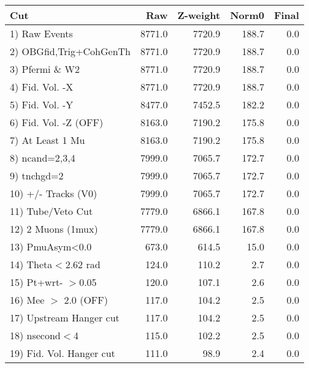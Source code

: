  \begin{table}[h!]\centering
 \begin{tabular}{||l||r|r|r|r||}
 \hline
 \hline
 Cut & Raw & Z-weight & Norm0 & Final \\
 \hline
  1) Raw Events           &      8771.0 &      7720.9 &       188.7 &         0.0 \\
  2) OBGfid,Trig+CohGenTh &      8771.0 &      7720.9 &       188.7 &         0.0 \\
  3) Pfermi \& W2         &      8771.0 &      7720.9 &       188.7 &         0.0 \\
  4) Fid. Vol. -X         &      8771.0 &      7720.9 &       188.7 &         0.0 \\
  5) Fid. Vol. -Y         &      8477.0 &      7452.5 &       182.2 &         0.0 \\
  6) Fid. Vol. -Z (OFF)   &      8163.0 &      7190.2 &       175.8 &         0.0 \\
  7) At Least 1 Mu        &      8163.0 &      7190.2 &       175.8 &         0.0 \\
  8) ncand=2,3,4          &      7999.0 &      7065.7 &       172.7 &         0.0 \\
  9) tnchgd=2             &      7999.0 &      7065.7 &       172.7 &         0.0 \\
 10) +/- Tracks (V0)      &      7999.0 &      7065.7 &       172.7 &         0.0 \\
 11) Tube/Veto Cut        &      7779.0 &      6866.1 &       167.8 &         0.0 \\
 12) 2 Muons (1mux)       &      7779.0 &      6866.1 &       167.8 &         0.0 \\
 13) PmuAsym<0.0          &       673.0 &       614.5 &        15.0 &         0.0 \\
 14) Theta$<$2.62 rad     &       124.0 &       110.2 &         2.7 &         0.0 \\
 15) Pt+wrt- $>$0.05      &       120.0 &       107.1 &         2.6 &         0.0 \\
 16) Mee $>$ 2.0  (OFF)   &       117.0 &       104.2 &         2.5 &         0.0 \\
 17) Upstream Hanger cut  &       117.0 &       104.2 &         2.5 &         0.0 \\
 18) nsecond$<$4          &       115.0 &       102.2 &         2.5 &         0.0 \\
 19) Fid. Vol. Hanger cut &       111.0 &        98.9 &         2.4 &         0.0 \\

\end{tabular}
\end{table}
